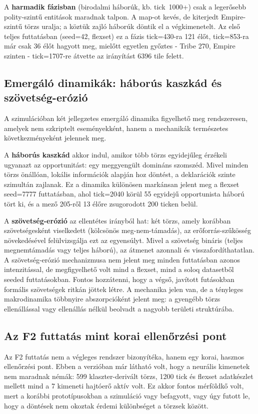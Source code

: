 A \textbf{harmadik fázisban} (birodalmi háborúk, kb. tick~1000+) csak a legerősebb
polity-szintű entitások maradnak talpon. A map-ot kevés, de kiterjedt Empire-szintű
törzs uralja; a köztük zajló háborúk döntik el a végkimenetelt. Az első teljes futtatásban
(seed=42, flexset) ez a fázis tick=430-ra 121 élőt, tick=853-ra már csak 36 élőt
hagyott meg, mielőtt egyetlen győztes - Tribe 270, Empire szinten - tick=1707-re
átvette az irányítást 6396 tile felett.

\subsection*{Emergáló dinamikák: háborús kaszkád és szövetség-erózió}

A szimulációban két jellegzetes emergáló dinamika figyelhető meg rendszeresen,
amelyek nem szkriptelt eseményekként, hanem a mechanikák természetes következményeként
jelennek meg.

A \textbf{háborús kaszkád} akkor indul, amikor több törzs egyidejűleg érzékeli ugyanazt
az opportunitást: egy meggyengült domináns szomszéd. Mivel minden törzs önállóan,
lokális információk alapján hoz döntést, a deklarációk szinte szimultán zajlanak.
Ez a dinamika különösen markánsan jelent meg a flexset seed=7777 futtatásban,
ahol tick=2040 körül 55 egyidejű opportunista háború tört ki, és a mező 205-ről
13 élőre zsugorodott 200 ticken belül.

A \textbf{szövetség-erózió} az ellentétes irányból hat: két törzs, amely korábban
szövetségesként viselkedett (kölcsönös meg-nem-támadás), az erőforrás-szűkösség
növekedésével felülvizsgálja ezt az egyensúlyt. Mivel a szövetség bináris
(teljes megnemtámadás vagy teljes háború), az átmenet azonnali és visszafordíthatatlan.
A szövetség-erózió mechanizmusa nem jelent meg minden futtatásban azonos intenzitással,
de megfigyelhető volt mind a flexset, mind a soloq datasetből seeded futtatásokban.
Fontos hozzátenni, hogy a végső, javított futásokban formális szövetségek ritkán
jöttek létre. A mechanika jelen van, de a tényleges makrodinamika többnyire
abszorpcióként jelent meg: a gyengébb törzs ellenállással vagy ellenállás nélkül
beolvadt a nagyobb területi struktúrába.

\subsection*{Az F2 futtatás mint korai ellenőrzési pont}

Az F2 futtatás nem a végleges rendszer bizonyítéka, hanem egy korai, hasznos
ellenőrzési pont. Ebben a verzióban már látható volt, hogy a neurális kimenetek nem
maradnak némák: 599 klaszter-derivált törzs, 1200 tick és flexset adatkészlet mellett
mind a 7 kimeneti hajtóerő aktív volt. Ez akkor fontos mérföldkő volt, mert a korábbi
prototípusokban a szimuláció vagy befagyott, vagy úgy futott le, hogy a döntések
nem okoztak érdemi különbséget a törzsek között.

